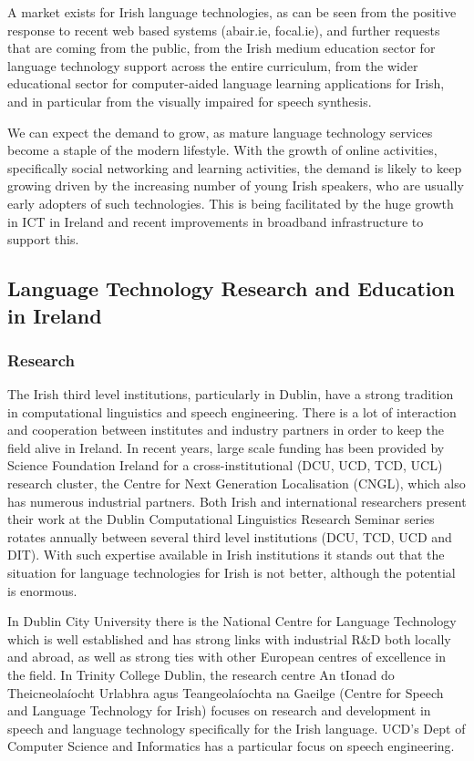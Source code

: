 \begin{multicols}{2}
A market exists for Irish language technologies, as can be seen from the positive response to recent web based systems (abair.ie, focal.ie), and further requests that are coming from the public, from the Irish medium education sector for language technology support across the entire curriculum,  from the wider educational sector for computer-aided language learning applications for Irish, and in particular from the visually impaired for speech synthesis. 

We can expect the demand to grow, as mature language technology services become a staple of the modern lifestyle. With the growth of online activities, specifically social networking and learning activities, the demand is likely to keep growing  driven by the increasing number  of young Irish speakers, who are usually early adopters of such technologies. This is being facilitated by the huge growth in ICT in Ireland and recent improvements in broadband infrastructure to support this.


\subsection{Language Technology Research and Education in Ireland}

\subsubsection{Research}

The Irish third level institutions, particularly in Dublin, have a strong tradition in computational linguistics and speech engineering. There is a lot of interaction and cooperation between institutes and industry partners in order to keep the field alive in Ireland. In recent years, large scale funding has been provided by Science Foundation Ireland for a cross-institutional (DCU, UCD, TCD, UCL) research cluster, the Centre for Next Generation Localisation (CNGL), which also has numerous industrial partners. Both Irish and international researchers present their work at the Dublin Computational Linguistics Research Seminar series rotates annually between several third level institutions (DCU, TCD, UCD and DIT). With such expertise available in Irish institutions it stands out that the situation for language technologies for Irish is not better, although the potential is enormous. 

In Dublin City University there is the National Centre for Language Technology which is well established and has strong links with industrial R\&D both locally and abroad, as well as strong ties with other European centres of excellence in the field. In Trinity College Dublin, the research centre An tIonad do Theicneolaíocht Urlabhra agus Teangeolaíochta na Gaeilge (Centre for Speech and Language Technology for Irish) focuses on research and development in speech and language technology specifically for the Irish language. UCD’s Dept of Computer Science and Informatics has a particular focus on speech engineering.



\end{multicols}

